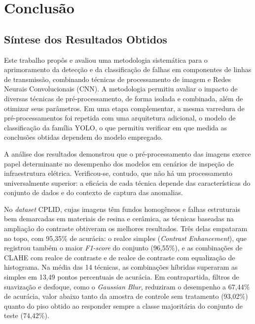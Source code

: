 \chapter{Conclusão}
\label{chap:conclusao}

\section{Síntese dos Resultados Obtidos}
Este trabalho propôs e avaliou uma metodologia sistemática para o aprimoramento da detecção e da classificação de falhas em componentes de linhas de transmissão, combinando técnicas de processamento de imagem e Redes Neurais Convolucionais (CNN). A metodologia permitiu avaliar o impacto de diversas técnicas de pré-processamento, de forma isolada e combinada, além de otimizar seus parâmetros. Em uma etapa complementar, a mesma varredura de pré-processamentos foi repetida com uma arquitetura adicional, o modelo de classificação da família YOLO, o que permitiu verificar em que medida as conclusões obtidas dependem do modelo empregado.

A análise dos resultados demonstrou que o pré-processamento das imagens exerce papel determinante no desempenho dos modelos em cenários de inspeção de infraestrutura elétrica. Verificou-se, contudo, que não há um processamento universalmente superior: a eficácia de cada técnica depende das características do conjunto de dados e do contexto de captura das anomalias.

No \textit{dataset} CPLID, cujas imagens têm fundos homogêneos e falhas estruturais bem demarcadas em materiais de resina e cerâmica, as técnicas baseadas na ampliação do contraste obtiveram os melhores resultados. Três delas empataram no topo, com 95,35\% de acurácia: o realce simples (\textit{Contrast Enhancement}), que registrou também o maior \textit{F1-score} do conjunto (96,55\%), e as combinações de CLAHE com realce de contraste e de realce de contraste com equalização de histograma. Na média das 14 técnicas, as combinações híbridas superaram as simples em 13,49 pontos percentuais de acurácia. Em contrapartida, filtros de suavização e desfoque, como o \textit{Gaussian Blur}, reduziram o desempenho a 67,44\% de acurácia, valor abaixo tanto da amostra de controle sem tratamento (93,02\%) quanto do piso obtido ao responder sempre a classe majoritária do conjunto de teste (74,42\%).

